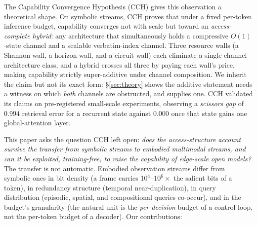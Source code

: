 \documentclass[10pt]{article}
\theoremstyle{definition}
\theoremstyle{plain}
\begin{document}
The Capability Convergence Hypothesis (CCH) \citep{cch} gives this observation a theoretical shape. On symbolic streams, CCH proves that under a fixed per-token inference budget, capability converges not with scale but toward an \emph{access-complete hybrid}: any architecture that simultaneously holds a compressive $O(1)$-state channel and a scalable verbatim-index channel. Three resource walls (a Shannon wall, a horizon wall, and a circuit wall) each eliminate a single-channel architecture class, and a hybrid crosses all three by paying each wall's price, making capability strictly super-additive under channel composition. We inherit the claim but not its exact form: \S\ref{sec:theory} shows the additive statement needs a witness on which \emph{both} channels are obstructed, and supplies one. CCH validated its claims on pre-registered small-scale experiments, observing a \emph{scissors gap} of $0.994$ retrieval error for a recurrent state against $0.000$ once that state gains one global-attention layer.

This paper asks the question CCH left open: \emph{does the access-structure account survive the transfer from symbolic streams to embodied multimodal streams, and can it be exploited, training-free, to raise the capability of edge-scale open models?} The transfer is not automatic. Embodied observation streams differ from symbolic ones in bit density (a frame carries $10^4$--$10^6\times$ the salient bits of a token), in redundancy structure (temporal near-duplication), in query distribution (episodic, spatial, and compositional queries co-occur), and in the budget's granularity (the natural unit is the \emph{per-decision} budget of a control loop, not the per-token budget of a decoder). Our contributions:
\end{document}
